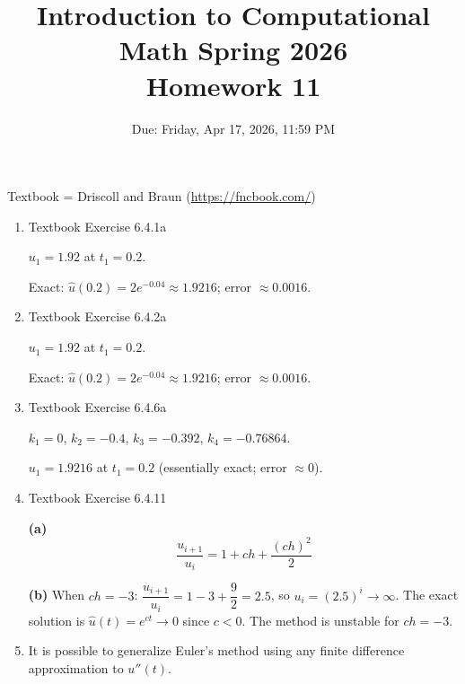 \documentclass[reqno, answers]{exam}
\title{Introduction to Computational Math Spring 2026 \\ Homework 11}
\date{Due: Friday, Apr 17, 2026, 11:59 PM}
\author{}
\begin{document}
\maketitle
\thispagestyle{empty}

Textbook = Driscoll and Braun (\url{https://fncbook.com/})

\begin{enumerate}

  \item Textbook Exercise 6.4.1a
        \begin{solution}
          $u_1 = \boxed{1.92}$ at $t_1 = 0.2$.

          Exact: $\hat{u}(0.2) = 2e^{-0.04} \approx 1.9216$; error $\approx 0.0016$.
        \end{solution}
  \item Textbook Exercise 6.4.2a
        \begin{solution}
          $u_1 = \boxed{1.92}$ at $t_1 = 0.2$.

          Exact: $\hat{u}(0.2) = 2e^{-0.04} \approx 1.9216$; error $\approx 0.0016$.
        \end{solution}
  \item Textbook Exercise 6.4.6a
        \begin{solution}
          $k_1 = 0$, $k_2 = -0.4$, $k_3 = -0.392$, $k_4 = -0.76864$.

          $u_1 = \boxed{1.9216}$ at $t_1 = 0.2$ (essentially exact; error $\approx 0$).
        \end{solution}
  \item Textbook Exercise 6.4.11
        \begin{solution}
          \textbf{(a)}
          \[
            \frac{u_{i+1}}{u_i} = 1 + ch + \frac{(ch)^2}{2}
          \]

          \textbf{(b)} When $ch = -3$: $\dfrac{u_{i+1}}{u_i} = 1 - 3 + \dfrac{9}{2} = 2.5$, so $u_i = (2.5)^i \to \infty$.
          The exact solution is $\hat{u}(t) = e^{ct} \to 0$ since $c < 0$.
          The method is unstable for $ch = -3$.
        \end{solution}


  \item It is possible to generalize Euler's method using any finite difference approximation to $u''(t)$.
\end{enumerate}
\end{document}

